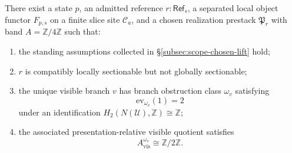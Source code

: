 \begin{proposition}\label{ex:end-to-end}
There exist a state $p$, an admitted reference $r:\mathsf{Ref}_s$, a separated local object functor $F_{p,s}$ on a finite slice site $\mathcal C_a$, and a chosen realization prestack $\mathfrak P_r$ with band $A=\mathbb Z/4\mathbb Z$ such that:
\begin{enumerate}[label=(\roman*),nosep]
\item the standing assumptions collected in \S\ref{subsec:scope-chosen-lift} hold;
\item $r$ is compatibly locally sectionable but not globally sectionable;
\item the unique visible branch $v$ has branch obstruction class $\omega_v$ satisfying
\[
\mathrm{ev}_{\omega_v}(1)=2
\]
under an identification $H_2(N(\mathcal U),\mathbb Z)\cong \mathbb Z$;
\item the associated presentation-relative visible quotient satisfies
\[
A_{\mathrm{vis}}^{\omega_v}\cong \mathbb Z/2\mathbb Z.
\]
\end{enumerate}
\end{proposition}

